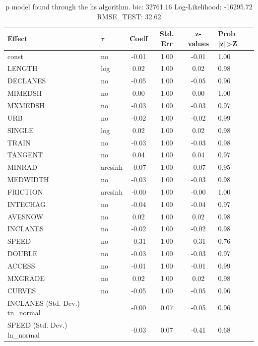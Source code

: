 \begin{table}
	\caption{p model found through the hs algorithm. bic: 32761.16 Log-Likelihood: -16295.72 RMSE_TEST: 32.62}
	\begin{center}
		\begin{tabular}{|l|l|c|c|c|l|}
			\hline
			Effect & $\tau$ & Coeff & Std. Err & z-values & Prob |z|>Z \\
			\hline
			const & no & -0.01 & 1.00 & -0.01 & 1.00 \\
			\hline
			LENGTH & log & 0.02 & 1.00 & 0.02 & 0.98 \\
			\hline
			DECLANES & no & -0.05 & 1.00 & -0.05 & 0.96 \\
			\hline
			MIMEDSH & no & 0.00 & 1.00 & 0.00 & 1.00 \\
			\hline
			MXMEDSH & no & -0.03 & 1.00 & -0.03 & 0.97 \\
			\hline
			URB & no & -0.02 & 1.00 & -0.02 & 0.99 \\
			\hline
			SINGLE & log & 0.02 & 1.00 & 0.02 & 0.98 \\
			\hline
			TRAIN & no & -0.03 & 1.00 & -0.03 & 0.98 \\
			\hline
			TANGENT & no & 0.04 & 1.00 & 0.04 & 0.97 \\
			\hline
			MINRAD & arcsinh & -0.07 & 1.00 & -0.07 & 0.95 \\
			\hline
			MEDWIDTH & no & -0.03 & 1.00 & -0.03 & 0.98 \\
			\hline
			FRICTION & arcsinh & -0.00 & 1.00 & -0.00 & 1.00 \\
			\hline
			INTECHAG & no & -0.04 & 1.00 & -0.04 & 0.97 \\
			\hline
			AVESNOW & no & 0.02 & 1.00 & 0.02 & 0.98 \\
			\hline
			INCLANES & no & -0.02 & 1.00 & -0.02 & 0.98 \\
			\hline
			SPEED & no & -0.31 & 1.00 & -0.31 & 0.76 \\
			\hline
			DOUBLE & no & -0.03 & 1.00 & -0.03 & 0.97 \\
			\hline
			ACCESS & no & -0.01 & 1.00 & -0.01 & 0.99 \\
			\hline
			MXGRADE & no & 0.02 & 1.00 & 0.02 & 0.98 \\
			\hline
			CURVES & no & -0.05 & 1.00 & -0.05 & 0.96 \\
			\hline
			INCLANES (Std. Dev.) tn_normal &  & -0.00 & 0.07 & -0.05 & 0.96 \\
			\hline
			SPEED (Std. Dev.) ln_normal &  & -0.03 & 0.07 & -0.41 & 0.68 \\

\end{tabular}
\end{center}
\end{table}
